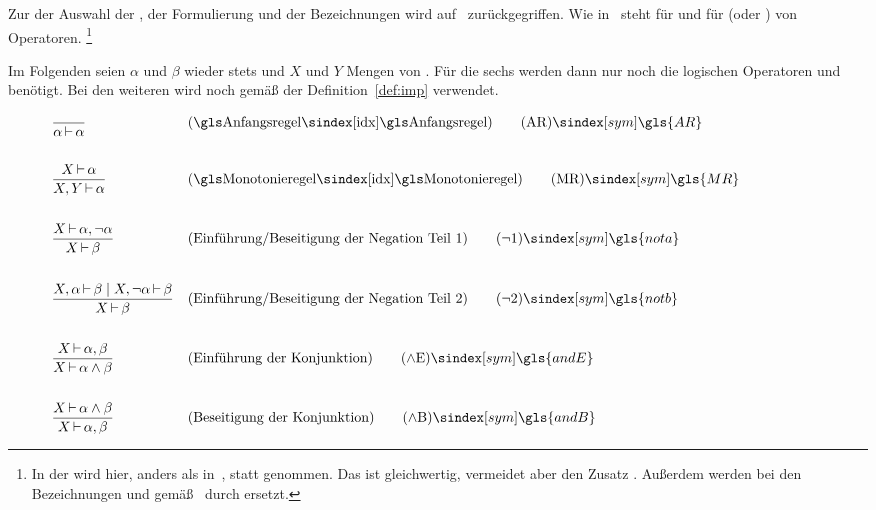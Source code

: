 Zur der Auswahl der , der Formulierung und der Bezeichnungen wird auf~\cite{bib:Rautenberg,bib:NatuerlichesSchliessen} zurückgegriffen.
Wie in~\cite{bib:NatuerlichesSchliessen} steht  für  und  für  (oder ) von Operatoren.%
\footnote{%
	In der  wird hier, anders als in~\cite{bib:Rautenberg},  statt  genommen. Das ist gleichwertig, vermeidet aber den Zusatz .
	Außerdem werden bei den Bezeichnungen  und  gemäß~\cite{bib:NatuerlichesSchliessen} durch \forqt{$\andE$} \textbzw \forqt{$\andB$} ersetzt.
}

Im Folgenden seien $\alpha$ und $\beta$ wieder stets  und $X$ und $Y$ Mengen von .
Für die sechs  werden dann nur noch die logischen Operatoren \symqt{$\lnot$} und \symqt{$\land$} benötigt.
Bei den weiteren  wird noch \symqt{$\limp$} gemäß der Definition~\vref{def:imp} verwendet.

\begin{align}
	& \frac{}{\alpha\abltb\alpha}
	& & (\text{\glsIdx{Anfangsregel}})
	\tag{\tagAR} \sym{\gls{AR}} \label{def:Anfangsregel}
	\\\\
	& \frac{X\abltb\alpha}{X,Y\abltb\alpha}
	& & (\text{\glsIdx{Monotonieregel}})
	\tag{\tagMR} \sym{\gls{MR}} \label{def:Monotonieregel}
	\\\\
	& \frac{X\abltb\alpha,\lnot\alpha}{X\abltb\beta}
	& & (\text{Einführung/Beseitigung der Negation Teil 1})
	\tag{\tagnota} \sym{\gls{nota}} \label{def:nota}
	\\\\
	& \frac{X,\alpha\abltb\beta \und X,\lnot\alpha\abltb\beta}{X\abltb\beta}
	& & (\text{Einführung/Beseitigung der Negation Teil 2})
	\tag{\tagnotb} \sym{\gls{notb}} \label{def:notb}
	\\\\
	& \frac{X\abltb\alpha,\beta}{X\abltb\alpha\land\beta}
	& & (\text{Einführung der Konjunktion})
	\tag{\tagandE} \sym{\gls{andE}} \label{def:andE}
	\\\\
	& \frac{X\abltb\alpha\land\beta}{X\abltb\alpha,\beta}
	& & (\text{Beseitigung der Konjunktion})
	\tag{\tagandB} \sym{\gls{andB}} \label{def:andB}
	\formulatoleft
\end{align}

